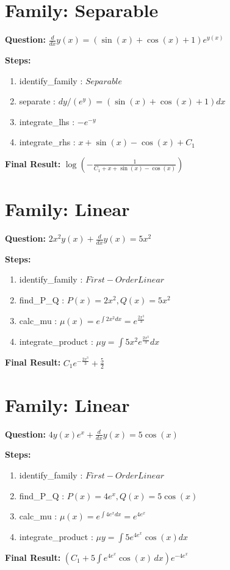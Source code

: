 \documentclass{article}
\begin{document}
\section*{Family: Separable}
\textbf{Question:} $\frac{d}{d x} y{\left(x \right)} = \left(\sin{\left(x \right)} + \cos{\left(x \right)} + 1\right) e^{y{\left(x \right)}}$

\textbf{Steps:}
\begin{enumerate}
\item identify_family :  $Separable$
\item separate :  $dy / (e^{y}) = (\sin{\left(x \right)} + \cos{\left(x \right)} + 1) dx$
\item integrate_lhs :  $- e^{- y}$
\item integrate_rhs :  $x + \sin{\left(x \right)} - \cos{\left(x \right)} + C_1$
\end{enumerate}
\textbf{Final Result:} $\log{\left(- \frac{1}{C_{1} + x + \sin{\left(x \right)} - \cos{\left(x \right)}} \right)}$

\section*{Family: Linear}
\textbf{Question:} $2 x^{2} y{\left(x \right)} + \frac{d}{d x} y{\left(x \right)} = 5 x^{2}$

\textbf{Steps:}
\begin{enumerate}
\item identify_family :  $First-Order Linear$
\item find_P_Q :  $P(x)=2 x^{2}, Q(x)=5 x^{2}$
\item calc_mu :  $\mu(x) = e^{\int 2 x^{2} dx} = e^{\frac{2 x^{3}}{3}}$
\item integrate_product :  $\mu y = \int 5 x^{2} e^{\frac{2 x^{3}}{3}} dx$
\end{enumerate}
\textbf{Final Result:} $C_{1} e^{- \frac{2 x^{3}}{3}} + \frac{5}{2}$

\section*{Family: Linear}
\textbf{Question:} $4 y{\left(x \right)} e^{x} + \frac{d}{d x} y{\left(x \right)} = 5 \cos{\left(x \right)}$

\textbf{Steps:}
\begin{enumerate}
\item identify_family :  $First-Order Linear$
\item find_P_Q :  $P(x)=4 e^{x}, Q(x)=5 \cos{\left(x \right)}$
\item calc_mu :  $\mu(x) = e^{\int 4 e^{x} dx} = e^{4 e^{x}}$
\item integrate_product :  $\mu y = \int 5 e^{4 e^{x}} \cos{\left(x \right)} dx$
\end{enumerate}
\textbf{Final Result:} $\left(C_{1} + 5 \int e^{4 e^{x}} \cos{\left(x \right)}\, dx\right) e^{- 4 e^{x}}$
\end{document}
